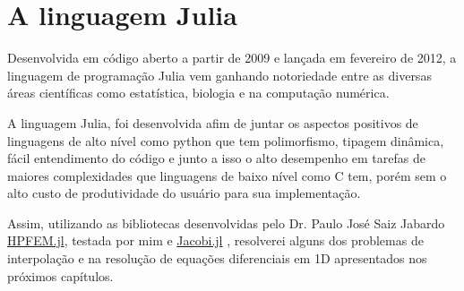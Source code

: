  
\section{A linguagem Julia}
Desenvolvida em código aberto a partir de 2009 e lançada em fevereiro de 2012, a linguagem de programação Julia vem ganhando notoriedade entre as diversas áreas científicas como estatística, biologia e na computação numérica.

A linguagem Julia, foi desenvolvida afim de juntar os aspectos positivos de linguagens de alto nível como python que tem polimorfismo, tipagem dinâmica, fácil entendimento do código e junto a isso o alto desempenho em tarefas de maiores complexidades que linguagens de baixo nível como C tem, porém sem o  alto custo de produtividade do usuário para sua implementação.

Assim, utilizando as bibliotecas desenvolvidas pelo  Dr. Paulo José Saiz Jabardo \href{www.github.com/pjabardo/HPFEM.jl}{HPFEM.jl}, testada por mim e \href{www.github.com/pjabardo/Jacobi.jl}{Jacobi.jl} , resolverei alguns dos problemas de interpolação e na resolução de equações diferenciais em 1D apresentados nos próximos capítulos.
 
\pagebreak


%
%
%




